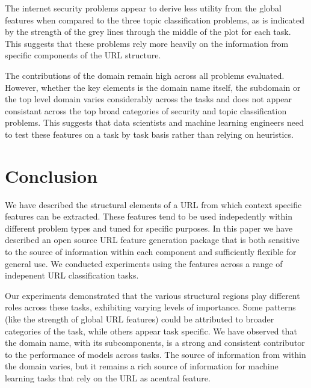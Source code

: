 \documentclass{aircc}
\begin{document}
The internet security problems appear to derive less utility from the global features when compared to the three
topic classification problems, as is indicated by the strength of the grey lines through the middle of the plot 
for each task. This suggests that these problems rely more heavily on the information from specific components
of the URL structure.

The contributions of the domain remain high across all problems evaluated. However, whether the key elements is the
domain name itself, the subdomain or the top level domain varies considerably across the tasks and does
not appear consistant across the top broad categories of security and topic classification problems. 
This suggests that data scientists and machine learning engineers
need to test these features on a task by task basis rather than relying on heuristics.


\section{Conclusion}

We have described the structural elements of a URL from which context specific features can be extracted.
These features tend to be used indepedently within different problem types and tuned for specific purposes. 
In this paper we have described an open source URL feature generation package that is both sensitive to the 
source of information within each component and sufficiently flexible for general use. We conducted experiments
using the features across a range of indepenent URL classification tasks. 

Our experiments demonstrated that the various structural regions play different roles across 
these tasks, exhibiting varying levels of importance. Some patterns (like the strength of global URL features)
could be attributed to broader categories of the task, while others appear task specific.
We have observed that the domain name, with its subcomponents, is a strong and consistent contributor to the
performance of models across tasks. The source of information from within the domain varies, but it remains
a rich source of information for machine learning tasks that rely on the URL as acentral feature.




\end{document}
